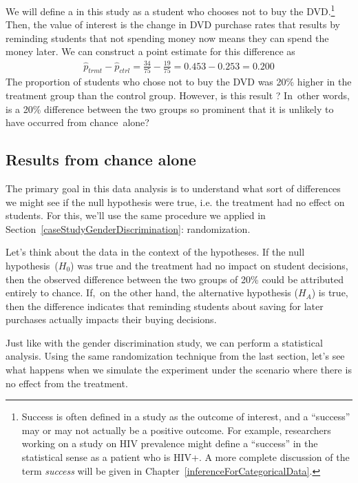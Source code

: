 We will define a  in this study as a student who chooses not to buy the DVD.\footnote{Success is often defined in a study as the outcome of interest, and a ``success'' may or may not actually be a positive outcome. For example, researchers working on a study on HIV prevalence might define a ``success'' in the statistical sense as a patient who is HIV+. A more complete discussion of the term \emph{success} will be given in Chapter~\ref{inferenceForCategoricalData}. } Then, the value of interest is the change in DVD purchase rates that results by reminding students that not spending money now means they can spend the money later.
We can construct a point estimate for this difference as
\begin{align*}
\hat{p}_{trmt} - \hat{p}_{ctrl}
  = \frac{34}{75} - \frac{19}{75}
  = 0.453 - 0.253
  = 0.200
\end{align*}
The proportion of students who chose not to buy the DVD was 20\% higher in the treatment group than the control group.
However, is this result ? In~other words, is a 20\% difference between the two groups so prominent that it is unlikely to have occurred from chance~alone?

\subsection{Results from chance alone}

The primary goal in this data analysis is to understand what sort of differences we might see if the null hypothesis were true, i.e. the treatment had no effect on students. For this, we'll use the same procedure we applied in Section~\ref{caseStudyGenderDiscrimination}: randomization.

Let's think about the data in the context of the hypotheses. If the null  hypothesis~($H_0$) was true and the treatment had no impact on student decisions, then the observed difference between the two groups of 20\% could be attributed entirely to chance. If,~on the other hand, the alternative hypothesis ($H_A$) is true, then the difference indicates that reminding students about saving for later purchases actually impacts their buying decisions.

Just like with the gender discrimination study, we can perform a statistical analysis. Using the same randomization technique from the last section, let's see what happens when we simulate the experiment under the scenario where there is no effect from the treatment.

